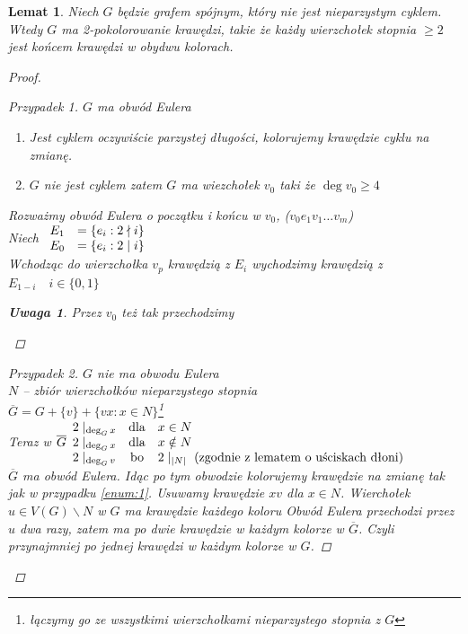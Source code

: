 \documentclass[12pt,a4paper]{article}
\newtheorem{lemat}{Lemat}
\theoremstyle{definition}
\newtheorem{uwaga}{Uwaga}
\begin{document}
\begin{lemat}
Niech $G$ będzie grafem spójnym, który nie jest nieparzystym cyklem. Wtedy $G$ ma 2-pokolorowanie krawędzi, takie że każdy wierzchołek stopnia $\geqslant 2$ jest końcem krawędzi w obydwu kolorach.
\begin{proof}
\begin{proof}[Przypadek 1]$G$ ma obwód Eulera\\
\begin{enumerate}
	\item Jest cyklem oczywiście parzystej długości, kolorujemy krawędzie cyklu na zmianę.
	\item $G$ nie jest cyklem zatem $G$ ma wiezchołek $v_0$ taki że $\deg v_0 \geqslant 4$\label{enum:1}
\end{enumerate}
\emph{Rozważmy obwód Eulera o początku i końcu w $v_0$, ($v_0e_1v_1\dots v_m$)}\\
Niech $\begin{array}{l l}
  E_1 & = \{e_i : 2\nmid i\}\\
  E_0 &= \{e_i : 2\mid i\}
\end{array}$\\
Wchodząc do wierzchołka $v_p$ krawędzią z $E_i$ wychodzimy krawędzią z $E_{1-i} \quad i\in\{0,1\}$
\begin{uwaga}
Przez $v_0$ też tak przechodzimy
\end{uwaga}
\end{proof}

\begin{proof}[Przypadek 2] $G$ nie ma obwodu Eulera\\
$N$ -- zbiór wierzchołków nieparzystego stopnia\\
$\overline{G} = G + \{v\} + \{vx : x\in N\}$\footnote{łączymy go ze wszystkimi wierzchołkami nieparzystego stopnia z $G$}\\
Teraz w $\overline{G}
\begin{array}{l c l}
	2\mid_{\deg_Gx} & \text{dla} & x\in N\\
	2\mid_{\deg_Gx} & \text{dla} & x\notin N\\
	2\mid_{\deg_Gv} & \text{bo}  & 2\mid_{|N|} \text{ (zgodnie z lematem o uściskach dłoni)}
\end{array}$\\
$\overline{G}$ ma obwód Eulera. Idąc po tym obwodzie kolorujemy krawędzie na zmianę tak jak w przypadku \ref{enum:1}. Usuwamy krawędzie $xv$ dla $x\in N$. \emph{Wierchołek $u\in V(G)\smallsetminus N$ w $G$ ma krawędzie każdego koloru}
Obwód Eulera przechodzi przez $u$ dwa razy, zatem ma po dwie krawędzie w każdym kolorze w $\overline{G}$. Czyli przynajmniej po jednej krawędzi w każdym kolorze w $G$.
\end{proof}
\end{proof}
\end{lemat}
\end{document}
